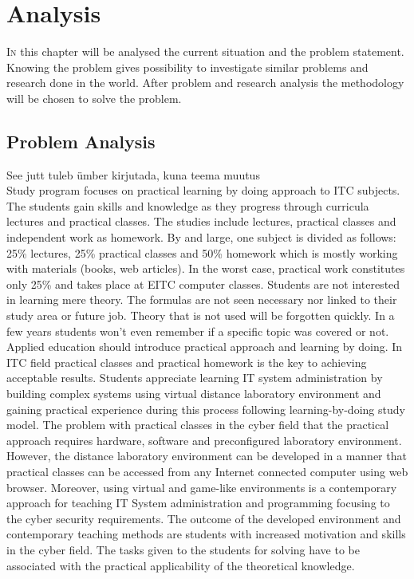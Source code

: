 \chapter{Analysis}
\label{analysis}
\lettrine[lraise=0.1, nindent=0em, slope=-.5em]{\color{Violet}I}{n} this chapter will be analysed the current situation and the problem statement. Knowing the problem gives possibility to investigate similar problems and research done in the world. After problem and research analysis the methodology will be chosen to solve the problem.




\section{Problem Analysis}
\label{Problem Analysis}

{\color{red} See jutt tuleb ümber kirjutada, kuna teema muutus}\\
Study program focuses on practical learning by doing approach to ITC subjects. The students gain skills and knowledge as they progress through curricula lectures and practical classes. The studies include lectures, practical classes and independent work as homework. By and large, one subject is divided as follows: 25\% lectures, 25\% practical classes and 50\% homework which is mostly working with materials (books, web articles). In the worst case, practical work constitutes only 25\% and takes place at \gls{EITC} computer classes. Students are not interested in learning mere theory. The formulas are not seen necessary nor linked to their study area or future job. Theory that is not used will be forgotten quickly. In a few years students won't even remember if a specific topic was covered or not. Applied education should introduce practical approach and learning by doing. In ITC field practical classes and practical homework is the key to achieving acceptable results. Students appreciate learning IT system administration by building complex systems using virtual distance laboratory environment and gaining practical experience during this process following learning-by-doing study model.
The problem with practical classes in the cyber field that the practical approach requires hardware, software and preconfigured laboratory environment. However, the  distance laboratory environment can be developed in a manner  that practical classes can be accessed from any Internet connected computer using web browser. Moreover, using virtual and game-like environments is a contemporary approach for teaching IT System administration and programming focusing to the cyber security requirements. The outcome of the developed environment and contemporary teaching methods are students with increased motivation and skills in the cyber field. The tasks given to the students for solving have to be associated with the practical applicability of the theoretical knowledge.






